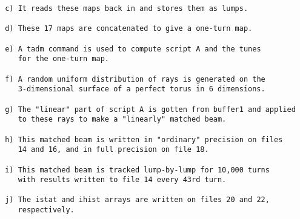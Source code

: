 \begin{footnotesize}
\begin{verbatim}
 c) It reads these maps back in and stores them as lumps.

 d) These 17 maps are concatenated to give a one-turn map.

 e) A tadm command is used to compute script A and the tunes
    for the one-turn map.

 f) A random uniform distribution of rays is generated on the
    3-dimensional surface of a perfect torus in 6 dimensions.

 g) The "linear" part of script A is gotten from buffer1 and applied
    to these rays to make a "linearly" matched beam.

 h) This matched beam is written in "ordinary" precision on files
    14 and 16, and in full precision on file 18.

 i) This matched beam is tracked lump-by-lump for 10,000 turns
    with results written to file 14 every 43rd turn.

 j) The istat and ihist arrays are written on files 20 and 22,
    respectively.


\end{verbatim}
\end{footnotesize}
